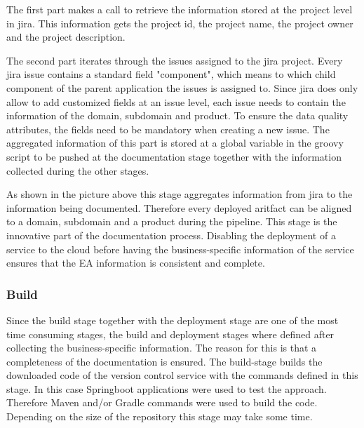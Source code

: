 The first part makes a call to retrieve the information stored at the project level in jira. This information gets the project id, the project name, the project owner and the project description. 

The second part iterates through the issues assigned to the jira project. Every jira issue contains a standard field "component", which means to which child component of the parent application the issues is assigned to. Since jira does only allow to add customized fields at an issue level, each issue needs to contain the information of the domain, subdomain and product. To ensure the data quality attributes, the fields need to be mandatory when creating a new issue. The aggregated information of this part is stored at a global variable in the groovy script to be pushed at the documentation stage together with the information collected during the other stages.

As shown in the picture above this stage aggregates information from jira to the information being documented. Therefore every deployed aritfact can be aligned to a domain, subdomain and a product during the pipeline. This stage is the innovative part of the documentation process. Disabling the deployment of a service to the cloud before having the business-specific information of the service ensures that the EA information is consistent and complete. 

\subsubsection{Build}
Since the build stage together with the deployment stage are one of the most time consuming stages, the build and deployment stages where defined after collecting the business-specific information. The reason for this is that a completeness of the documentation is ensured. 
The build-stage builds the downloaded code of the version control service with the commands defined in this stage. In this case Springboot applications were used to test the approach. Therefore Maven and/or Gradle commands were used to build the code. Depending on the size of the repository this stage may take some time.

